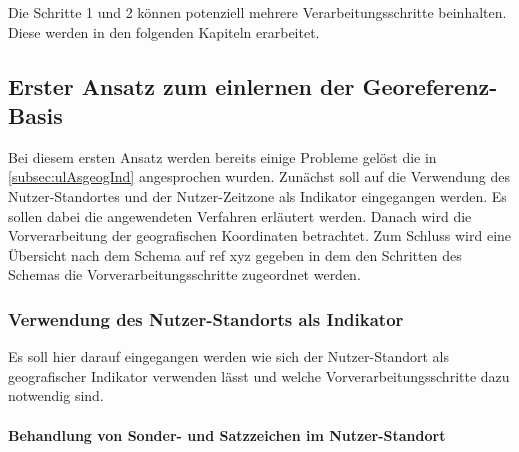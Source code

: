 						Die Schritte 1 und 2 können potenziell mehrere Verarbeitungsschritte beinhalten. 
						Diese werden in den folgenden Kapiteln erarbeitet.

				\subsection{Erster Ansatz zum einlernen der Georeferenz-Basis}

					Bei diesem ersten Ansatz werden bereits einige Probleme gelöst die in \ref{subsec:ulAsgeogInd} angesprochen wurden. 
					Zunächst soll auf die Verwendung des Nutzer-Standortes und der Nutzer-Zeitzone als Indikator eingegangen werden.
					Es sollen dabei die angewendeten Verfahren erläutert werden.
					Danach wird die Vorverarbeitung der geografischen Koordinaten betrachtet.
					Zum Schluss wird eine Übersicht nach dem Schema auf ref xyz gegeben in dem den Schritten des Schemas die Vorverarbeitungsschritte zugeordnet werden. 

					\subsubsection{Verwendung des Nutzer-Standorts als Indikator}

					Es soll hier darauf eingegangen werden wie sich der Nutzer-Standort als geografischer Indikator verwenden lässt und welche Vorverarbeitungsschritte dazu notwendig sind. 

					\paragraph{Behandlung von Sonder- und Satzzeichen im Nutzer-Standort}  

